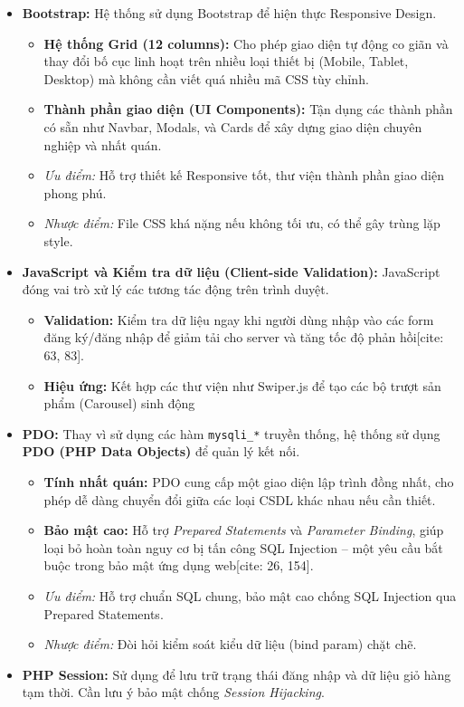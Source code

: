\begin{itemize}
\begin{itemize}
\end{itemize}
    \item \textbf{Bootstrap:}
Hệ thống sử dụng Bootstrap để hiện thực Responsive Design.
\begin{itemize}
    \item \textbf{Hệ thống Grid (12 columns):} Cho phép giao diện tự động co giãn và thay đổi bố cục linh hoạt trên nhiều loại thiết bị (Mobile, Tablet, Desktop) mà không cần viết quá nhiều mã CSS tùy chỉnh.
    \item \textbf{Thành phần giao diện (UI Components):} Tận dụng các thành phần có sẵn như Navbar, Modals, và Cards để xây dựng giao diện chuyên nghiệp và nhất quán.
\end{itemize}
    \begin{itemize}
        \item \textit{Ưu điểm:} Hỗ trợ thiết kế Responsive tốt, thư viện thành phần giao diện phong phú.
        \item \textit{Nhược điểm:} File CSS khá nặng nếu không tối ưu, có thể gây trùng lặp style.
    \end{itemize}
    \item \textbf{JavaScript và Kiểm tra dữ liệu (Client-side Validation): }
JavaScript đóng vai trò xử lý các tương tác động trên trình duyệt.
\begin{itemize}
    \item \textbf{Validation:} Kiểm tra dữ liệu ngay khi người dùng nhập vào các form đăng ký/đăng nhập để giảm tải cho server và tăng tốc độ phản hồi[cite: 63, 83].
    \item \textbf{Hiệu ứng:} Kết hợp các thư viện như Swiper.js để tạo các bộ trượt sản phẩm (Carousel) sinh động
    \end{itemize}
    \item \textbf{PDO:}
    Thay vì sử dụng các hàm \texttt{mysqli\_*} truyền thống, hệ thống sử dụng \textbf{PDO (PHP Data Objects)} để quản lý kết nối.
\begin{itemize}
    \item \textbf{Tính nhất quán:} PDO cung cấp một giao diện lập trình đồng nhất, cho phép dễ dàng chuyển đổi giữa các loại CSDL khác nhau nếu cần thiết.
    \item \textbf{Bảo mật cao:} Hỗ trợ \textit{Prepared Statements} và \textit{Parameter Binding}, giúp loại bỏ hoàn toàn nguy cơ bị tấn công SQL Injection – một yêu cầu bắt buộc trong bảo mật ứng dụng web[cite: 26, 154].
\end{itemize}
    \begin{itemize}
        \item \textit{Ưu điểm:} Hỗ trợ chuẩn SQL chung, bảo mật cao chống SQL Injection qua Prepared Statements.
        \item \textit{Nhược điểm:} Đòi hỏi kiểm soát kiểu dữ liệu (bind param) chặt chẽ.
    \end{itemize}
    \item \textbf{PHP Session:} Sử dụng để lưu trữ trạng thái đăng nhập và dữ liệu giỏ hàng tạm thời. Cần lưu ý bảo mật chống \textit{Session Hijacking}.
\end{itemize}

